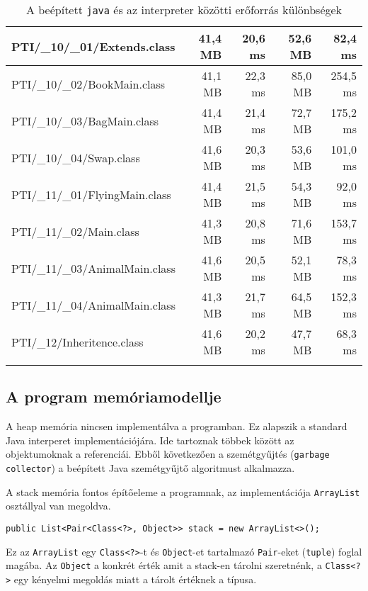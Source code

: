 \begin{center}
\begin{longtable}{ | l | r | r | r | r | }
		\hline
		PTI/\_10/\_01/Extends.class & 41,4 MB & 20,6 ms & 52,6 MB & 82,4 ms \\
		\hline
		PTI/\_10/\_02/BookMain.class & 41,1 MB & 22,3 ms & 85,0 MB & 254,5 ms \\
		\hline
		PTI/\_10/\_03/BagMain.class & 41,4 MB & 21,4 ms & 72,7 MB & 175,2 ms \\
		\hline
		PTI/\_10/\_04/Swap.class & 41,6 MB & 20,3 ms & 53,6 MB & 101,0 ms \\
		\hline
		PTI/\_11/\_01/FlyingMain.class & 41,4 MB & 21,5 ms & 54,3 MB & 92,0 ms \\
		\hline
		PTI/\_11/\_02/Main.class & 41,3 MB & 20,8 ms & 71,6 MB & 153,7 ms \\
		\hline
		PTI/\_11/\_03/AnimalMain.class & 41,6 MB & 20,5 ms & 52,1 MB & 78,3 ms \\
		\hline
		PTI/\_11/\_04/AnimalMain.class & 41,3 MB & 21,7 ms & 64,5 MB & 152,3 ms \\
		\hline
		PTI/\_12/Inheritence.class & 41,6 MB & 20,2 ms & 47,7 MB & 68,3 ms \\
		\hline

		\caption[Erőforrás különbségek]{A beépített \lstinline{java} és az interpreter közötti erőforrás különbségek}
		\label{table:resource}
	\end{longtable}
\end{center}

\subsection{A program memóriamodellje}

A heap memória nincsen implementálva a programban. Ez alapszik a standard Java interperet implementációjára. Ide tartoznak többek között az objektumoknak a referenciái. Ebből következően a szemétgyűjtés (\lstinline{garbage collector}) a beépített Java szemétgyűjtő algoritmust alkalmazza.

A stack memória fontos építőeleme a programnak, az implementációja \lstinline{ArrayList} osztállyal van megoldva.
\begin{verbatim}
public List<Pair<Class<?>, Object>> stack = new ArrayList<>();
\end{verbatim}
Ez az \lstinline{ArrayList} egy \lstinline{Class<?>}-t és \lstinline{Object}-et tartalmazó \lstinline{Pair}-eket (\lstinline{tuple}) foglal magába. Az \lstinline{Object} a konkrét érték amit a stack-en tárolni szeretnénk, a \lstinline{Class<?>} egy kényelmi megoldás miatt a tárolt értéknek a típusa.

